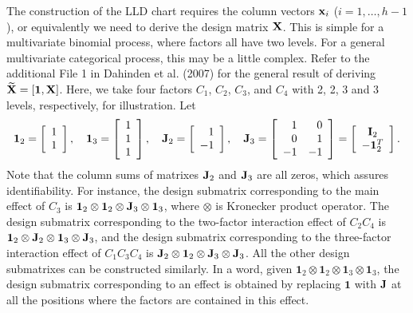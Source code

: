 The construction of the LLD chart requires the column vectors ${\bf x}_i$
($i=1,\ldots,h-1$), or equivalently we need to derive the design matrix $\bf X$.
This is simple for a multivariate binomial process, where factors all have two
levels. For a general multivariate categorical process, this may be a little
complex. Refer to the additional File 1 in Dahinden et al. (2007) for the general
result of deriving $\widetilde{{\bf X}}=[\boldsymbol1,{\bf X}]$. Here, we take four factors
$C_1$, $C_2$, $C_3$, and $C_4$ with 2, 2, 3 and 3 levels, respectively, for
illustration. Let
\[
\mathbf{1}_2=\left[\begin{array}{r}1\\1\end{array}\right],\quad
\mathbf{1}_3=\left[\begin{array}{r}1\\1\\1\end{array}\right],\quad {\bf
J}_2=\left[\begin{array}{r}1\\-1\end{array}\right],\quad {\bf
J}_3=\left[\begin{array}{rr}1&0\\0&1\\-1&-1\end{array}\right]
=\left[\begin{array}{c}{\bf I}_2\\-\mathbf{1}_2^T\end{array}\right].
\]
Note that the column sums of matrixes ${\bf J}_2$ and ${\bf J}_3$ are all zeros,
which assures identifiability. For instance, the design submatrix corresponding to
the main effect of $C_3$ is $\mathbf{1}_2\otimes\mathbf{1}_2\otimes{\bf
J}_3\otimes\mathbf{1}_3$, where $\otimes$ is Kronecker product operator. The design
submatrix corresponding to the two-factor interaction effect of $C_2C_4$ is
$\mathbf{1}_2\otimes{\bf J}_2\otimes\mathbf{1}_3\otimes{\bf J}_3$, and the design
submatrix corresponding to the three-factor interaction effect of $C_1C_3C_4$ is
${\bf J}_2\otimes\mathbf{1}_2\otimes{\bf J}_3\otimes{\bf J}_3$. All the other design
submatrixes can be constructed similarly. In a word, given
$\mathbf{1}_2\otimes\mathbf{1}_2\otimes\bm{1}_3\otimes\mathbf{1}_3$, the design
submatrix corresponding to an effect is obtained by replacing $\bm{1}$ with ${\bf
J}$ at all the positions where the factors are contained in this effect.




